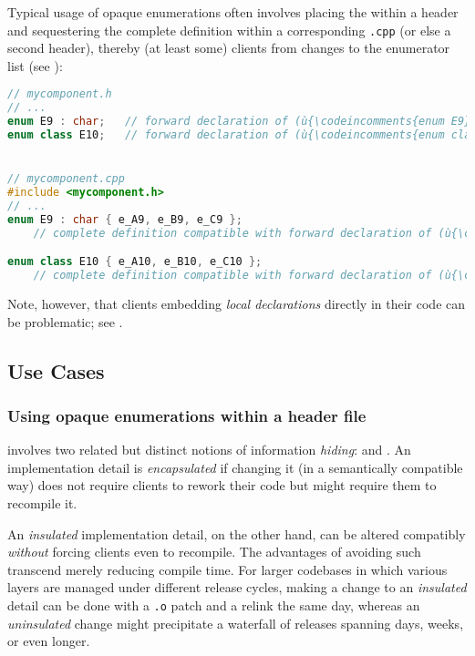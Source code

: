 \noindent Typical usage of opaque enumerations often involves placing the
 within a header and sequestering the
complete definition within a corresponding \lstinline!.cpp! (or else a
second header), thereby  (at least some) clients from
changes to the enumerator list (see ):

\begin{lstlisting}[language=C++]
// mycomponent.h
// ...
enum E9 : char;   // forward declaration of (ù{\codeincomments{enum E9}}ù)
enum class E10;   // forward declaration of (ù{\codeincomments{enum class E10}}ù)


// mycomponent.cpp
#include <mycomponent.h>
// ...
enum E9 : char { e_A9, e_B9, e_C9 };
    // complete definition compatible with forward declaration of (ù{\codeincomments{E9}}ù)

enum class E10 { e_A10, e_B10, e_C10 };
    // complete definition compatible with forward declaration of (ù{\codeincomments{E10}}ù)
\end{lstlisting}

\noindent Note, however, that clients embedding \emph{local declarations} directly
in their code can be problematic; see .

\subsection[Use Cases]{Use Cases}\label{use-cases-opaqueenum}

\subsubsection[Using opaque enumerations within a header file]{Using opaque enumerations within a header file}\label{using-opaque-enumerations-within-a-header-file}

 involves two related but distinct notions of
information \emph{hiding}:  and .
An implementation detail is \emph{encapsulated} if changing it (in a
semantically compatible way) does not require clients to rework their
code but might require them to recompile it.

An \emph{insulated} implementation detail, on the other hand, can be
altered compatibly \emph{without} forcing clients even to recompile.
The advantages of avoiding such  transcend
merely reducing compile time. For larger codebases in which various
layers are managed under different release cycles, making a change to an
\emph{insulated} detail can be done with a \lstinline!.o! patch and a
relink the same day, whereas an \emph{uninsulated} change might
precipitate a waterfall of releases spanning days, weeks, or even
longer.

